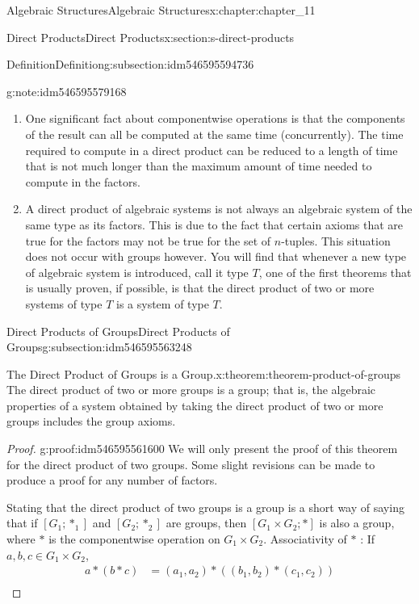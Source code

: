 \documentclass[oneside,10pt,]{book}
\numberwithin{equation}{section}
\begin{document}
\begin{chapterptx}{Algebraic Structures}{}{Algebraic Structures}{}{}{x:chapter:chapter_11}
\begin{sectionptx}{Direct Products}{}{Direct Products}{}{}{x:section:s-direct-products}
\begin{subsectionptx}{Definition}{}{Definition}{}{}{g:subsection:idm546595594736}
\begin{note}{}{g:note:idm546595579168}
\begin{enumerate}[label=(\alph*)]
\item{}One significant fact about componentwise operations is that the components of the result can all be computed at the same time (concurrently). The time required to compute in a direct product can be reduced to a length of time that is not much longer than the maximum amount of time needed to compute in the factors.%
\item{}A direct product of algebraic systems is not always an algebraic system of the same type as its factors. This is due to the fact that certain axioms that are true for the factors may not be true for the set of \(n\)-tuples. This situation does not occur with groups however. You will find that whenever a new type of algebraic system is introduced, call it type \(T\), one of the first theorems that is usually proven, if possible, is that the direct product of two or more systems of type \(T\) is a system of type \(T\).%
\end{enumerate}
%
\end{note}
\end{subsectionptx}
%
%
\typeout{************************************************}
\typeout{************************************************}
%
\begin{subsectionptx}{Direct Products of Groups}{}{Direct Products of Groups}{}{}{g:subsection:idm546595563248}
\begin{theorem}{The Direct Product of Groups is a Group.}{}{x:theorem:theorem-product-of-groups}%
The direct product of two or more groups is a group; that is, the algebraic properties of a system obtained by taking the direct product of two or more groups includes the group axioms.%
\end{theorem}
\begin{proof}{}{g:proof:idm546595561600}
We will only present the proof of this theorem for the direct product of two groups. Some slight revisions can be made to produce a proof for any number of factors.%
\par
Stating that the direct product of two groups is a group is a short way of saying that if \(\left[G_1; *_1\right]\) and \(\left[G_2; *_2\right]\) are groups, then \(\left[G_1\times G_2; * \right]\) is also a group, where \(*\) is the componentwise operation on \(G_1\times G_2\). Associativity of \(*\) : If \(a, b, c \in G_1\times G_2\),%
\begin{equation*}
\begin{split}
a * (b * c) & =\left(a_1,a_2\right)*\left(\left(b_1,b_2\right)*\left(c_1,c_2\right)\right)\\

\end{split}
\end{equation*}
\end{proof}
\end{subsectionptx}
\end{sectionptx}
\end{chapterptx}
\end{document}
